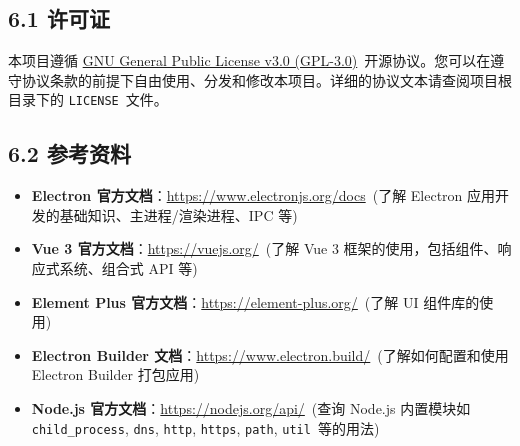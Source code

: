 \documentclass{article}
\begin{document}
\subsection*{6.1 许可证}

本项目遵循 \href{https://www.gnu.org/licenses/gpl-3.0.en.html}{GNU General Public License v3.0 (GPL-3.0)}\ 开源协议。您可以在遵守协议条款的前提下自由使用、分发和修改本项目。详细的协议文本请查阅项目根目录下的 \texttt{LICENSE}\ 文件。

\subsection*{6.2 参考资料}

\begin{itemize}
    \item \textbf{Electron 官方文档}：\href{https://www.electronjs.org/docs}{https://www.electronjs.org/docs}\ (了解 Electron 应用开发的基础知识、主进程/渲染进程、IPC 等)
    \item \textbf{Vue 3 官方文档}：\href{https://vuejs.org/}{https://vuejs.org/}\ (了解 Vue 3 框架的使用，包括组件、响应式系统、组合式 API 等)
    \item \textbf{Element Plus 官方文档}：\href{https://element-plus.org/}{https://element-plus.org/}\ (了解 UI 组件库的使用)
    \item \textbf{Electron Builder 文档}：\href{https://www.electron.build/}{https://www.electron.build/}\ (了解如何配置和使用 Electron Builder 打包应用)
    \item \textbf{Node.js 官方文档}：\href{https://nodejs.org/api/}{https://nodejs.org/api/}\ (查询 Node.js 内置模块如 \texttt{child\_process}, \texttt{dns}, \texttt{http}, \texttt{https}, \texttt{path}, \texttt{util}\ 等的用法)
\end{itemize}
\end{document}
